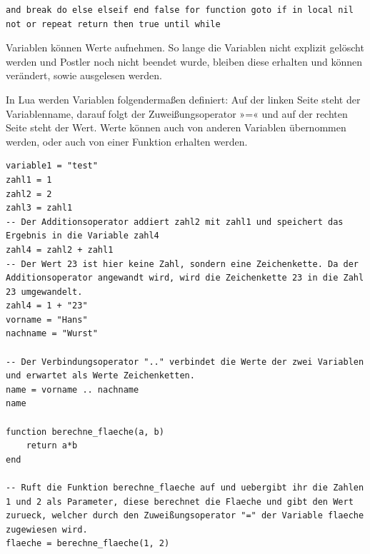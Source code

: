 \documentclass[a4paper,10pt]{article}
\newcounter{subsubsubsection}[subsubsection]
\begin{document}
\begin{lstlisting}[style=Lua]
and break do else elseif end false for function goto if in local nil not or repeat return then true until while
\end{lstlisting}


Variablen können Werte aufnehmen. So lange die Variablen nicht explizit gelöscht werden und Postler noch nicht beendet wurde, bleiben diese erhalten und können verändert, sowie ausgelesen werden.

In Lua werden Variablen folgendermaßen definiert:
Auf der linken Seite steht der Variablenname, darauf folgt der Zuweißungsoperator »=« und auf der rechten Seite steht der Wert. Werte können auch von anderen Variablen übernommen werden, oder auch von einer Funktion erhalten werden.

\begin{lstlisting}[style=Lua]
variable1 = "test"
zahl1 = 1
zahl2 = 2
zahl3 = zahl1
-- Der Additionsoperator addiert zahl2 mit zahl1 und speichert das Ergebnis in die Variable zahl4
zahl4 = zahl2 + zahl1
-- Der Wert 23 ist hier keine Zahl, sondern eine Zeichenkette. Da der Additionsoperator angewandt wird, wird die Zeichenkette 23 in die Zahl 23 umgewandelt.
zahl4 = 1 + "23"
vorname = "Hans"
nachname = "Wurst"

-- Der Verbindungsoperator ".." verbindet die Werte der zwei Variablen und erwartet als Werte Zeichenketten.
name = vorname .. nachname
name 

function berechne_flaeche(a, b)
    return a*b
end

-- Ruft die Funktion berechne_flaeche auf und uebergibt ihr die Zahlen 1 und 2 als Parameter, diese berechnet die Flaeche und gibt den Wert zurueck, welcher durch den Zuweißungsoperator "=" der Variable flaeche zugewiesen wird.
flaeche = berechne_flaeche(1, 2)

\end{lstlisting}

\end{document}
